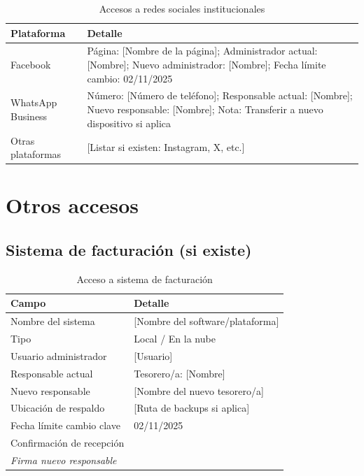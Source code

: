 \begin{table}[H]
\centering
\caption{Accesos a redes sociales institucionales}
\label{tab:acceso-redes}
\begin{tabularx}{\textwidth}{@{}lX@{}}
\toprule
\textbf{Plataforma} & \textbf{Detalle} \\
\midrule
Facebook & Página: [Nombre de la página]; Administrador actual: [Nombre]; Nuevo administrador: [Nombre]; Fecha límite cambio: 02/11/2025 \\
WhatsApp Business & Número: [Número de teléfono]; Responsable actual: [Nombre]; Nuevo responsable: [Nombre]; Nota: Transferir a nuevo dispositivo si aplica \\
Otras plataformas & [Listar si existen: Instagram, X, etc.] \\
\bottomrule
\end{tabularx}
\end{table}

\section{Otros accesos}

\subsection*{Sistema de facturación (si existe)}

\begin{table}[H]
\centering
\caption{Acceso a sistema de facturación}
\label{tab:acceso-facturacion}
\begin{tabularx}{\textwidth}{@{}lX@{}}
\toprule
\textbf{Campo} & \textbf{Detalle} \\
\midrule
Nombre del sistema & [Nombre del software/plataforma] \\
Tipo & Local / En la nube \\
Usuario administrador & [Usuario] \\
Responsable actual & Tesorero/a: [Nombre] \\
Nuevo responsable & [Nombre del nuevo tesorero/a] \\
Ubicación de respaldo & [Ruta de backups si aplica] \\
Fecha límite cambio clave & 02/11/2025 \\
Confirmación de recepción & \underline{\hspace{5cm}} \\ \emph{Firma nuevo responsable} \\
\bottomrule
\end{tabularx}
\end{table}

